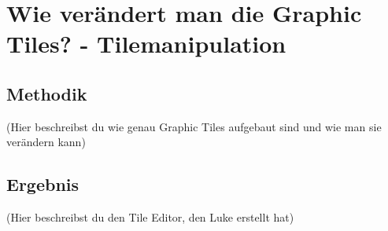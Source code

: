 \section{Wie verändert man die Graphic Tiles? - Tilemanipulation}

\subsection{Methodik}

(Hier beschreibst du wie genau Graphic Tiles aufgebaut sind und wie man sie verändern kann)

\subsection{Ergebnis}

(Hier beschreibst du den Tile Editor, den Luke erstellt hat)